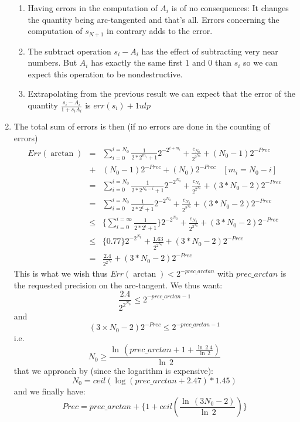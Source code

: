 \documentclass[12pt]{amsart}
\begin{document}
\begin{enumerate}
\begin{enumerate}
\item Having errors in the computation of $A_i$ is of no consequences: It changes the quantity being arc-tangented and that's all. Errors concerning the computation of $s_{N+1}$ in contrary adds to the error.
\item The subtract operation $s_i-A_i$ has the effect of subtracting very near numbers. But $A_i$ has exactly the same first $1$ and $0$ than $s_i$ so we can expect this operation to be nondestructive.
\item Extrapolating from the previous result we can expect that the error of the quantity $\frac{s_i-A_i}{1+s_iA_i}$ is $err(s_i)+1 ulp$
\end{enumerate}
\item The total sum of errors is then (if no errors are done in the counting of errors)
\begin{eqnarray*}
Err(\arctan)
&=&\sum_{i=0}^{i=N_0}\frac{1}{2*2^{m_i}+1}2^{-2^{i+m_i}}+\frac{c_{N_0}}{2^{2^{N_0}}}+(N_0-1)2^{-Prec}\\
&+&(N_0 -1)2^{-Prec}+(N_0)2^{-Prec}\;\;\;[m_i=N_0-i]\\
&=&\sum_{i=0}^{i=N_0}\frac{1}{2*2^{N_0-i}+1}2^{-2^{N_0}}+\frac{c_{N_0}}{2^{2^{N_0}}}+(3*N_0-2)2^{-Prec}\\
&=&\sum_{i=0}^{i=N_0}\frac{1}{2*2^{i}+1}2^{-2^{N_0}}+\frac{c_{N_0}}{2^{2^{N_0}}}+(3*N_0-2)2^{-Prec}\\
&\leq &\{\sum_{i=0}^{i=\infty}\frac{1}{2*2^{i}+1}\}2^{-2^{N_0}}+\frac{c_{N_0}}{2^{2^{N_0}}}+(3*N_0-2)2^{-Prec}\\
&\leq&\{0.77\}2^{-2^{N_0}}+\frac{1.63}{2^{2^{N_0}}}+(3*N_0-2)2^{-Prec}\\
&=&\frac{2.4}{2^{2^{N_0}}}+(3*N_0-2)2^{-Prec}
\end{eqnarray*}
This is what we wish thus $Err(\arctan)< 2^{-prec\_arctan}$ with $prec\_arctan$
is the requested precision on the arc-tangent.
We thus want:
\[\frac{2.4}{2^{2^{N_0}}}\leq 2^{-prec\_arctan-1}\]
and
\[(3 \times N_0-2)2^{-Prec}\leq 2^{-prec\_arctan-1}\]
i.e.
\[N_0\geq \frac{\ln\,(prec\_arctan+1+\frac{\ln\,2.4}{\ln\,2})}{\ln\,2}\]
that we approach by (since the logarithm is expensive):
\begin{equation*}
N_0=ceil(\log(prec\_arctan+2.47)*1.45)
\end{equation*}
and we finally have:
\begin{equation*}
Prec=prec\_arctan+\{1+ceil(\frac{\ln\,(3N_0-2)}{\ln\,2})\}
\end{equation*}
\end{enumerate}
\end{document}
